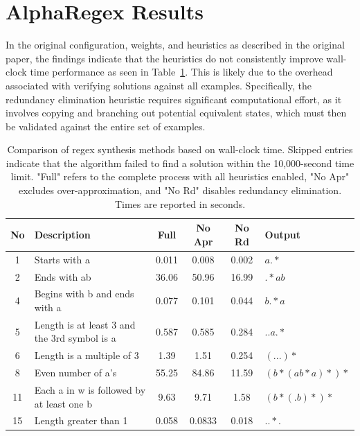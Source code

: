 \section{AlphaRegex Results}

\indent\indent In the original configuration, weights, and heuristics as described in the original paper, the findings indicate that the heuristics do not consistently improve wall-clock time performance as seen in Table~\ref{tab:alpha_regex_performance_seconds}. This is likely due to the overhead associated with verifying solutions against all examples. Specifically, the redundancy elimination heuristic requires significant computational effort, as it involves copying and branching out potential equivalent states, which must then be validated against the entire set of examples. 

\begin{table}[h!]
	\centering
	\caption{Comparison of regex synthesis methods based on wall-clock time. Skipped entries indicate that the algorithm failed to find a solution within the 10,000-second time limit. "Full" refers to the complete process with all heuristics enabled, "No Apr" excludes over-approximation, and "No Rd" disables redundancy elimination. Times are reported in seconds.}
	\label{tab:alpha_regex_performance_seconds}
	\begin{tabular}{|c|p{5cm}|c|c|c|l|}
	\hline
	\textbf{No} & \textbf{Description} & \textbf{Full} & \textbf{No Apr} & \textbf{No Rd} & \textbf{Output} \\
	\hline
	1 & Starts with a & 0.011 & 0.008 & 0.002 & $a.*$ \\
	2 & Ends with ab & 36.06 & 50.96 & 16.99 & $.*ab$ \\
	4 & Begins with b and ends with a & 0.077 & 0.101 & 0.044 & $b.*a$ \\
	5 & Length is at least 3 and the 3rd symbol is a & 0.587 & 0.585 & 0.284 & $..a.*$ \\
	6 & Length is a multiple of 3 & 1.39 & 1.51 & 0.254 & $(...)*$ \\
	8 & Even number of a's & 55.25 & 84.86 & 11.59 & $(b*(ab*a)*)*$ \\
	11 & Each a in w is followed by at least one b & 9.63 & 9.71 & 1.58 & $(b*(.b)*)*$ \\
	15 & Length greater than 1 & 0.058 & 0.0833 & 0.018 & $..*.$ \\
	\hline
\end{tabular}
\end{table}

